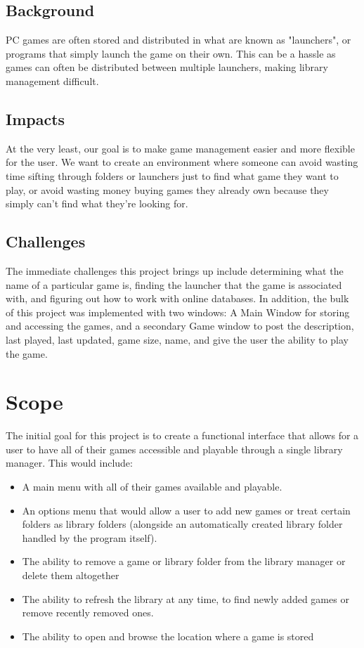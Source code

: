 \documentclass[10pt,conference,onecolumn,compsoc]{IEEEtran}
\begin{document}
\subsection{Background}
PC games are often stored and distributed in what are known as "launchers", or programs that simply launch the game on their own. This can be a hassle as games can often be distributed between multiple launchers, making library management difficult.
\subsection{Impacts}
At the very least, our goal is to make game management easier and more flexible for the user. We want to create an environment where someone can avoid wasting time sifting through folders or launchers just to find what game they want to play, or avoid wasting money buying games they already own because they simply can't find what they're looking for.

\subsection{Challenges}
The immediate challenges this project brings up include determining what the name of a particular game is, finding the launcher that the game is associated with, and figuring out how to work with online databases. In addition, the bulk of this project was implemented with two windows: A Main Window for storing and accessing the games, and a secondary Game window to post the description, last played, last updated, game size, name, and give the user the ability to play the game.

\section{Scope}
The initial goal for this project is to create a functional interface that allows for a user to have all of their games accessible and playable through a single library manager. This would include:

\begin{itemize}
\item A main menu with all of their games available and playable.
\item An options menu that would allow a user to add new games or treat certain folders as library folders (alongside an automatically created library folder handled by the program itself).
\item The ability to remove a game or library folder from the library manager or delete them altogether
\item The ability to refresh the library at any time, to find newly added games or remove recently removed ones.
\item The ability to open and browse the location where a game is stored
\end{itemize}
\end{document}

